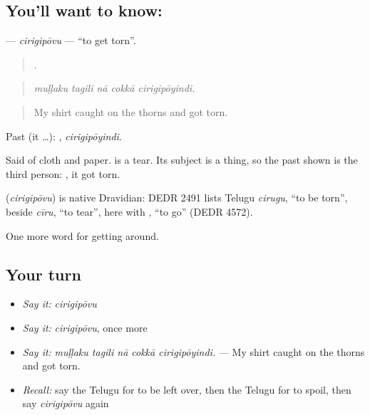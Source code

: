 \subsection*{You'll want to know: }
\textbf{} — \emph{cirigipōvu} — \textquotedblleft{}to get torn\textquotedblright{}.

\begin{quote}
    .
\end{quote}

\begin{quote}
\emph{muḷḷaku tagili nā cokkā cirigipōyindi.}
\end{quote}

\begin{quote}
My shirt caught on the thorns and got torn.
\end{quote}

Past (it …): , \emph{cirigipōyindi}.

Said of cloth and paper.  is a tear. Its subject is a thing, so the past shown is the third person: , it got torn.

\begin{cousinweb}
\textbf{} (\emph{cirigipōvu}) is native Dravidian: DEDR 2491 lists Telugu \emph{cirugu}, \textquotedblleft{}to be torn\textquotedblright{}, beside \emph{cīru}, \textquotedblleft{}to tear\textquotedblright{}, here with , \textquotedblleft{}to go\textquotedblright{} (DEDR 4572).
\end{cousinweb}

\begin{grammarlens}[title={What you've built}]
One more word for getting around.
\end{grammarlens}

\subsection*{Your turn}
\begin{itemize}
\raggedright
  \item \emph{Say it:} \emph{cirigipōvu}
  \item \emph{Say it:} \emph{cirigipōvu}, once more
  \item \emph{Say it:} \emph{muḷḷaku tagili nā cokkā cirigipōyindi.} — My shirt caught on the thorns and got torn.
  \item \emph{Recall:} say the Telugu for to be left over, then the Telugu for to spoil, then say \emph{cirigipōvu} again
\end{itemize}


